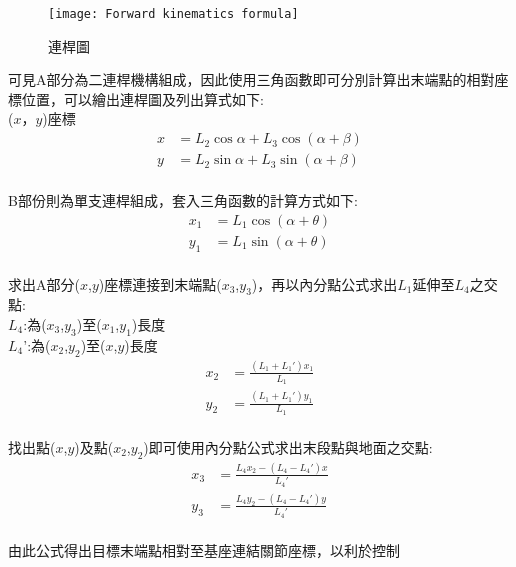 \begin{figure}[hbt!]
\begin{center}
\texttt{[image: Forward kinematics formula]}
\caption{\Large 連桿圖}\label{Forward kinematics formula}
\end{center}
\end{figure}

可見A部分為二連桿機構組成，因此使用三角函數即可分別計算出末端點的相對座標位置，可以繪出連桿圖及列出算式如下:\\
($x$，$y$)座標
\[
\begin{aligned}
x&=L_{2}\cos \alpha +L_{3}\cos \left( \alpha +\beta \right)\\
y&=L_{2}\sin \alpha +L_{3}\sin \left( \alpha +\beta \right)\\
\end{aligned}
\]

B部份則為單支連桿組成，套入三角函數的計算方式如下:\\
\[
\begin{aligned}
x_{1}&=L_{1}\cos \left( \alpha +\theta \right)\\
y_{1}&=L_{1}\sin \left( \alpha +\theta \right)\\
\end{aligned}
\]

求出A部分($x$,$y$)座標連接到末端點($x_3$,$y_3$)，再以內分點公式求出$L_1$延伸至$L_4$之交點:\\
$L_4$:為($x_3$,$y_3$)至($x_1$,$y_1$)長度\\
$L_4$':為($x_2$,$y_2$)至($x$,$y$)長度\\

\[
\begin{aligned}
x_{2}&= \frac{\left (L_{1} + L_{1}' \right) x_{1}}{L_{1}}\\
y_{2}&= \frac{\left (L_{1} + L_{1}' \right) y_{1}}{L_{1}}\\
\end{aligned}
\]

找出點($x$,$y$)及點($x_2$,$y_2$)即可使用內分點公式求出末段點與地面之交點:\\

\[
\begin{aligned}
x_{3}&= \frac{L_{4} x_{2} - \left (L_{4} - L_{4}' \right) x}{L_{4}'}\\
y_{3}&= \frac{L_{4} y_{2} - \left (L_{4} - L_{4}' \right) y}{L_{4}'}\\
\end{aligned}
\]

由此公式得出目標末端點相對至基座連結關節座標，以利於控制\\

